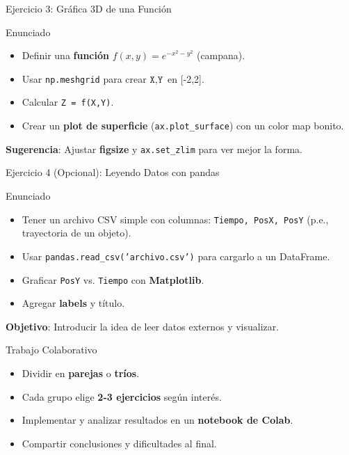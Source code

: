 \documentclass[10pt]{beamer}
\begin{document}
\begin{frame}{Ejercicio 3: Gráfica 3D de una Función}
  \begin{block}{Enunciado}
    \begin{itemize}
      \item Definir una \textbf{función} \(f(x,y) = e^{-x^2 - y^2}\) (campana).
      \item Usar \texttt{np.meshgrid} para crear \(\texttt{X}, \texttt{Y}\) en [-2,2].
      \item Calcular \texttt{Z = f(X,Y)}.
      \item Crear un \textbf{plot de superficie} (\texttt{ax.plot\_surface}) con un color map bonito.
    \end{itemize}
  \end{block}
  \textbf{Sugerencia}: Ajustar \textbf{figsize} y \texttt{ax.set\_zlim} para ver mejor la forma.
\end{frame}

\begin{frame}{Ejercicio 4 (Opcional): Leyendo Datos con pandas}
  \begin{block}{Enunciado}
    \begin{itemize}
      \item Tener un archivo CSV simple con columnas: \texttt{Tiempo, PosX, PosY} (p.e., trayectoria de un objeto).
      \item Usar \texttt{pandas.read\_csv('archivo.csv')} para cargarlo a un DataFrame.
      \item Graficar \texttt{PosY} vs. \texttt{Tiempo} con \textbf{Matplotlib}.
      \item Agregar \textbf{labels} y título.
    \end{itemize}
  \end{block}
  \textbf{Objetivo}: Introducir la idea de leer datos externos y visualizar.
\end{frame}

\begin{frame}{Trabajo Colaborativo}
  \begin{itemize}
    \item Dividir en \textbf{parejas} o \textbf{tríos}.
    \item Cada grupo elige \textbf{2-3 ejercicios} según interés.
    \item Implementar y analizar resultados en un \textbf{notebook de Colab}.
    \item Compartir conclusiones y dificultades al final.
  \end{itemize}
\end{frame}
\end{document}
